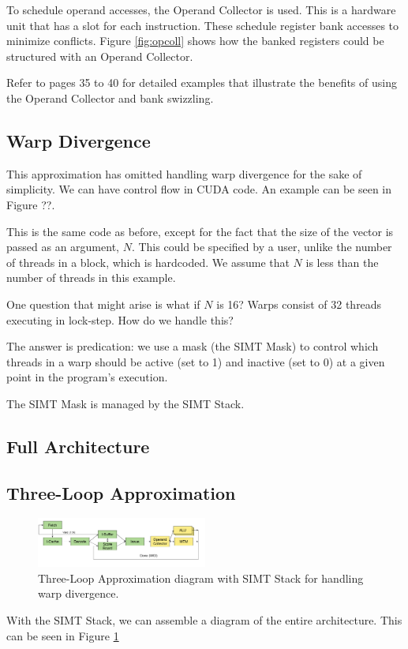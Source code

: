 To schedule operand accesses, the Operand Collector is used. This is a hardware unit that
has a slot for each instruction. These schedule register bank accesses to minimize conflicts.
Figure \ref{fig:opcoll} shows how the banked registers could be structured with an Operand Collector.

Refer to \cite{aamodt2018general} pages 35 to 40 for detailed examples that illustrate the benefits of using
the Operand Collector and bank swizzling.

\subsection{Warp Divergence}

This approximation has omitted handling warp divergence for the sake of simplicity.
We can have control flow in CUDA code. An example can be seen in Figure ??.

This is the same code as before, except for the fact that the size of the vector is passed
as an argument, $N$. This could be specified by a user, unlike the number of threads in a block,
which is hardcoded. We assume that $N$ is less than the number of threads in this example.

One question that might arise is what if $N$ is 16? Warps consist of 32 threads
executing in lock-step. How do we handle this?

The answer is predication: we use a mask (the SIMT Mask) to control which threads in a warp
should be active (set to 1) and inactive (set to 0) at a given point in the program's execution.

The SIMT Mask is managed by the SIMT Stack.

\subsection{Full Architecture}


\subsection{Three-Loop Approximation}

\begin{figure}[h]
    \centering
    \includegraphics[width=0.5\textwidth]{assets/3.png}
    \caption{Three-Loop Approximation diagram with SIMT Stack for handling warp divergence.}
    \label{fig:warpthreeloop}
\end{figure}

With the SIMT Stack, we can assemble a diagram of the entire architecture.
This can be seen in Figure \ref{fig:warpthreeloop} 
